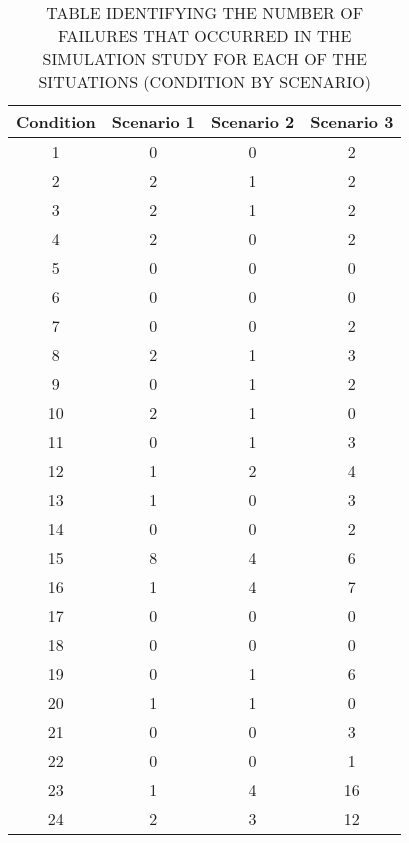 \documentclass{amsart}
\begin{document}
\setcounter{table}{0}
\renewcommand{\thetable}{C-\arabic{table}}
\begin{table}
\begin{center}
\caption{%
TABLE IDENTIFYING THE NUMBER OF
FAILURES THAT OCCURRED IN THE
SIMULATION STUDY FOR EACH OF
THE SITUATIONS
(CONDITION BY %
SCENARIO)}\label{Failure.Table}
\begin{tabular}{|c|c|c|c|}
  \hline
  Condition & Scenario 1 & Scenario 2 & Scenario 3 \\
  \hline
  1 & 0 & 0 & 2 \\
  2 & 2 & 1 & 2 \\
  3 & 2 & 1 & 2 \\
  4 & 2 & 0 & 2 \\
  5 & 0 & 0 & 0 \\
  6 & 0 & 0 & 0 \\
  7 & 0 & 0 & 2 \\
  8 & 2 & 1 & 3 \\\hline
  9 & 0 & 1 & 2 \\
  10 & 2 & 1 & 0 \\
  11 & 0 & 1 & 3 \\
  12 & 1 & 2 & 4\\
  13 & 1 & 0 & 3 \\
  14 & 0 & 0 & 2 \\
  15 & 8 & 4 & 6 \\
  16 & 1 & 4 & 7 \\\hline
  17 & 0 & 0 & 0 \\
  18 & 0 & 0 & 0 \\
  19 & 0 & 1 & 6 \\
  20 & 1 & 1 & 0 \\
  21 & 0 & 0 & 3 \\
  22 & 0 & 0 & 1 \\
  23 & 1 & 4 & 16 \\
  24 & 2 & 3 & 12 \\
  \hline
\end{tabular}
\end{center}
\end{table}
\clearpage \pagebreak
\end{document}
